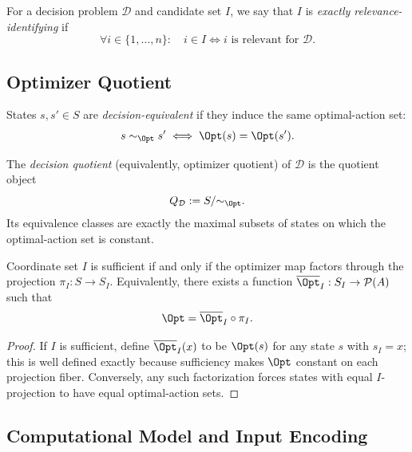 \begin{definition}\label{def:exact-identifiability}
For a decision problem $\mathcal{D}$ and candidate set $I$, we say that $I$ is \emph{exactly relevance-identifying} if
\[
\forall i \in \{1,\ldots,n\}:\quad i \in I \iff i \text{ is relevant for } \mathcal{D}.
\]
\end{definition}

\subsection{Optimizer Quotient}

\begin{definition}\label{def:decision-equiv}
States $s,s' \in S$ are \emph{decision-equivalent} if they induce the same optimal-action set:
\[
s \sim_{\Opt} s' \iff \Opt(s)=\Opt(s').
\]
\end{definition}

\begin{definition}\label{def:decision-quotient}
The \emph{decision quotient} (equivalently, optimizer quotient) of $\mathcal{D}$ is the quotient object
\[
Q_{\mathcal{D}} := S / {\sim_{\Opt}}.
\]
Its equivalence classes are exactly the maximal subsets of states on which the optimal-action set is constant.
\end{definition}

\begin{proposition}\label{prop:sufficiency-char}
Coordinate set $I$ is sufficient if and only if the optimizer map factors through the projection $\pi_I : S \to S_I$. Equivalently, there exists a function $\overline{\Opt}_I : S_I \to \mathcal{P}(A)$ such that
\[
\Opt = \overline{\Opt}_I \circ \pi_I.
\]
\end{proposition}

\begin{proof}
If $I$ is sufficient, define $\overline{\Opt}_I(x)$ to be $\Opt(s)$ for any state $s$ with $s_I = x$; this is well defined exactly because sufficiency makes $\Opt$ constant on each projection fiber. Conversely, any such factorization forces states with equal $I$-projection to have equal optimal-action sets.
\end{proof}

\subsection{Computational Model and Input Encoding}\label{sec:encoding}

